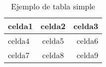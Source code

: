\begin{table}
    \centering
    \begin{tabular}{ |l|c|r| }
    \hline
    celda1 & celda2 & celda3 \\
    \hline
    celda4 & celda5 & celda6 \\
    celda7 & celda8 & celda9 \\
    \hline
    \end{tabular}
    \caption{Ejemplo de tabla simple}
    \label{table:tabla-ejemplo}
    \end{table}